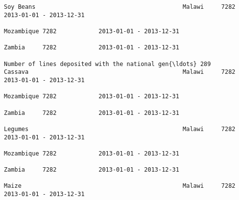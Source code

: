 \documentclass[11pt]{article}
\begin{document}
\begin{Verbatim}[commandchars=\\\{\}]
                                                                                                                                                              Soy Beans                                          Malawi     7282            2013-01-01 - 2013-12-31   
                                                                                                                                                                                                                 Mozambique 7282            2013-01-01 - 2013-12-31   
                                                                                                                                                                                                                 Zambia     7282            2013-01-01 - 2013-12-31   
                                                                         Number of lines deposited with the national gen{\ldots} 289                               Cassava                                            Malawi     7282            2013-01-01 - 2013-12-31   
                                                                                                                                                                                                                 Mozambique 7282            2013-01-01 - 2013-12-31   
                                                                                                                                                                                                                 Zambia     7282            2013-01-01 - 2013-12-31   
                                                                                                                                                              Legumes                                            Malawi     7282            2013-01-01 - 2013-12-31   
                                                                                                                                                                                                                 Mozambique 7282            2013-01-01 - 2013-12-31   
                                                                                                                                                                                                                 Zambia     7282            2013-01-01 - 2013-12-31   
                                                                                                                                                              Maize                                              Malawi     7282            2013-01-01 - 2013-12-31   

\end{Verbatim}
\end{document}
